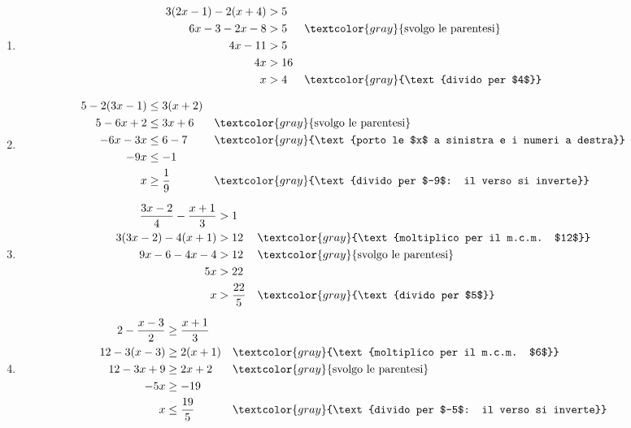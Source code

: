 \begin{question}[ID=1.4, subtitle={Disequazioni di primo grado con parentesi e frazioni}, difficulty=difficile, tags={disequazioni lineari}]
\begin{explanation}
\begin{enumerate}
\[\begin{aligned}
    x &\leq \dfrac15 && \textcolor{gray}{\text{divido per $5$}}
    \end{aligned}\]
    \item \[\begin{aligned}
    3(2x-1)-2(x+4) &> 5\\
    6x-3-2x-8 &> 5 && \textcolor{gray}{\text{svolgo le parentesi}}\\
    4x-11 &> 5\\
    4x &> 16\\
    x &> 4 && \textcolor{gray}{\text{divido per $4$}}
    \end{aligned}\]
    \item \[\begin{aligned}
    5-2(3x-1) &\leq 3(x+2)\\
    5-6x+2 &\leq 3x+6 && \textcolor{gray}{\text{svolgo le parentesi}}\\
    -6x-3x &\leq 6-7 && \textcolor{gray}{\text{porto le $x$ a sinistra e i numeri a destra}}\\
    -9x &\leq -1\\
    x &\geq \dfrac19 && \textcolor{gray}{\text{divido per $-9$: il verso si inverte}}
    \end{aligned}\]
    \item \[\begin{aligned}
    \dfrac{3x-2}{4}-\dfrac{x+1}{3} &> 1\\
    3(3x-2)-4(x+1) &> 12 && \textcolor{gray}{\text{moltiplico per il m.c.m. $12$}}\\
    9x-6-4x-4 &> 12 && \textcolor{gray}{\text{svolgo le parentesi}}\\
    5x &> 22\\
    x &> \dfrac{22}{5} && \textcolor{gray}{\text{divido per $5$}}
    \end{aligned}\]
    \item \[\begin{aligned}
    2-\dfrac{x-3}{2} &\geq \dfrac{x+1}{3}\\
    12-3(x-3) &\geq 2(x+1) && \textcolor{gray}{\text{moltiplico per il m.c.m. $6$}}\\
    12-3x+9 &\geq 2x+2 && \textcolor{gray}{\text{svolgo le parentesi}}\\
    -5x &\geq -19\\
    x &\leq \dfrac{19}{5} && \textcolor{gray}{\text{divido per $-5$: il verso si inverte}}
    \end{aligned}\]
\end{enumerate}
\end{explanation}
\end{question}


